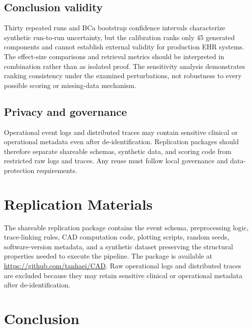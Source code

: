 \documentclass[english,preprint]{elsarticle}
\newcommand{\CAD}{\textsc{CAD}\xspace}
\begin{document}
\subsection{Conclusion validity}

Thirty repeated runs and BCa bootstrap confidence intervals characterize synthetic run-to-run uncertainty, but the calibration ranks only 45 generated components and cannot establish external validity for production EHR systems. The effect-size comparisons and retrieval metrics should be interpreted in combination rather than as isolated proof. The sensitivity analysis demonstrates ranking consistency under the examined perturbations, not robustness to every possible scoring or missing-data mechanism.

\subsection{Privacy and governance}

Operational event logs and distributed traces may contain sensitive clinical or operational metadata even after de-identification. Replication packages should therefore separate shareable schemas, synthetic data, and scoring code from restricted raw logs and traces. Any reuse must follow local governance and data-protection requirements.

\section{Replication Materials}\label{sec:replication}

The shareable replication package contains the event schema, preprocessing logic, trace-linking rules, \CAD computation code, plotting scripts, random seeds, software-version metadata, and a synthetic dataset preserving the structural properties needed to execute the pipeline. The package is available at \url{https://github.com/tanhaei/CAD}. Raw operational logs and distributed traces are excluded because they may retain sensitive clinical or operational metadata after de-identification.

\section{Conclusion}\label{sec:conclusion}
\end{document}
